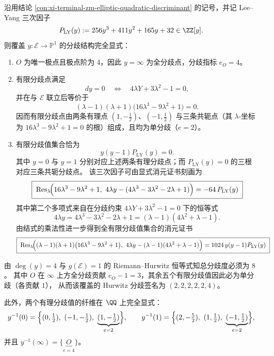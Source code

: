 \begin{conclusion}\label{con:xi-terminal-zm-elliptic-ramification-portrait}
沿用结论 \ref{con:xi-terminal-zm-elliptic-quadratic-discriminant} 的记号，并记 Lee--Yang 三次因子
\[
P_{\mathrm{LY}}(y):=256y^{3}+411y^{2}+165y+32\in\ZZ[y].
\]
则覆盖 \(y:\mathcal{E}\to\mathbb{P}^{1}\) 的分歧结构完全显式：
\begin{enumerate}
  \item \(O\) 为唯一极点且极点阶为 \(4\)，因此 \(y=\infty\) 为全分歧点，分歧指标 \(e_O=4\)。
  \item 有限分歧点满足
  \[
  dy=0\quad\Longleftrightarrow\quad 4\lambda Y+3\lambda^{2}-1=0,
  \]
  并在与 \(\mathcal{E}\) 联立后等价于
  \[
  (\lambda-1)(\lambda+1)\bigl(16\lambda^{3}-9\lambda^{2}+1\bigr)=0.
  \]
  因而有限分歧点由两条有理点 \((1,-\tfrac12)\)、\((-1,\tfrac12)\) 与三条共轭点（其 \(\lambda\)-坐标为 \(16\lambda^{3}-9\lambda^{2}+1=0\) 的根）组成，且均为单分歧（\(e=2\)）。
  \item 有限分歧值集合恰为
  \[
  y(y-1)P_{\mathrm{LY}}(y)=0.
  \]
  其中 \(y=0\) 与 \(y=1\) 分别对应上述两条有理分歧点；而 \(P_{\mathrm{LY}}(y)=0\) 的三根对应三条共轭分歧点。
  该三次因子可由显式消元证书刻画为
  \[
  \boxed{\;
  \mathrm{Res}_{\lambda}\!\Bigl(16\lambda^{3}-9\lambda^{2}+1,\ 4\lambda y-(4\lambda^{3}-3\lambda^{2}-2\lambda+1)\Bigr)
  =-64\,P_{\mathrm{LY}}(y)\;}
  \]
  其中第二个多项式来自在分歧约束 \(4\lambda Y+3\lambda^{2}-1=0\) 下的恒等式
  \[
  4\lambda y=4\lambda^{3}-3\lambda^{2}-2\lambda+1=(\lambda-1)(4\lambda^{2}+\lambda-1).
  \]
  由结式的乘法性进一步得到全有限分歧值集合的消元证书
  \[
  \boxed{\;
  \mathrm{Res}_{\lambda}\!\Bigl((\lambda-1)(\lambda+1)\bigl(16\lambda^{3}-9\lambda^{2}+1\bigr),\ 4\lambda y-(\lambda-1)(4\lambda^{2}+\lambda-1)\Bigr)
  =1024\,y(y-1)P_{\mathrm{LY}}(y)\;}
  \]
\end{enumerate}
\par
由 \(\deg(y)=4\) 与 \(g(\mathcal{E})=1\) 的 Riemann--Hurwitz 恒等式知总分歧度必须为 \(8\)。
其中 \(O\) 在 \(\infty\) 上方全分歧贡献 \(e_O-1=3\)，其余五个有限分歧值因此必为单分歧（各贡献 \(1\)），
从而该覆盖的 Hurwitz 分歧签名为 \((2,2,2,2,2,4)\)。
\par
此外，两个有理分歧值的纤维在 \(\QQ\) 上完全显式：
\[
y^{-1}(0)=\Bigl\{(0,\tfrac12),\ (-1,-\tfrac12),\ \underbrace{(1,-\tfrac12)}_{e=2}\Bigr\},
\qquad
y^{-1}(1)=\Bigl\{(2,-\tfrac52),\ (1,\tfrac12),\ \underbrace{(-1,\tfrac12)}_{e=2}\Bigr\},
\]
并且
\(
y^{-1}(\infty)=\{\underbrace{O}_{e=4}\}
\)。
\end{conclusion}
